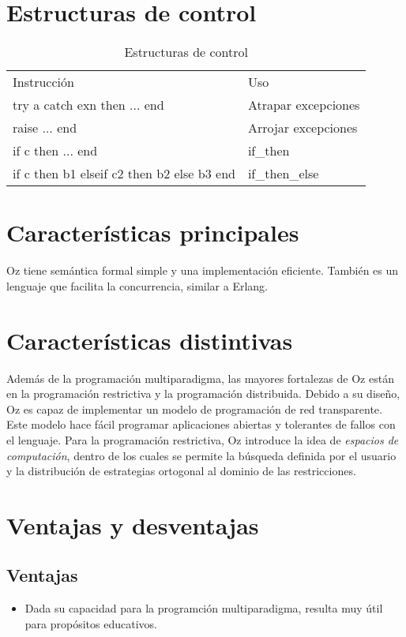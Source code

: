 \documentclass{IEEEtran}
\begin{document}
\section{Estructuras de control}
\begin{table}[H]
\centering
\caption{Estructuras de control}
\label{my-label}
\begin{tabular}{ll}
Instrucci\'on                              & Uso                 \\
try a catch exn then ... end               & Atrapar excepciones \\
raise ... end                              & Arrojar excepciones \\
if c then ... end                          & if\_then            \\
if c then b1 elseif c2 then b2 else b3 end & if\_then\_else     
\end{tabular}
\end{table}
\section{Caracter\'isticas principales}
Oz tiene sem\'antica formal simple y una implementaci\'on eficiente. Tambi\'en es un lenguaje que facilita la concurrencia, similar a Erlang.

\section{Caracter\'isticas distintivas}
Adem\'as de la programaci\'on multiparadigma, las mayores fortalezas de Oz est\'an en la programaci\'on restrictiva y la programaci\'on distribuida. Debido a su dise\~no, Oz es capaz de implementar un modelo de programaci\'on de red transparente. Este modelo hace f\'acil programar aplicaciones abiertas y tolerantes de fallos con el lenguaje. Para la programaci\'on restrictiva, Oz introduce la idea de \emph{espacios de computaci\'on}, dentro de los cuales se permite la b\'usqueda definida por el usuario y la distribuci\'on de estrategias ortogonal al dominio de las restricciones.
\section{Ventajas y desventajas}
\subsection{Ventajas}
\begin{itemize}
\item Dada su capacidad para la programci\'on multiparadigma, resulta muy \'util para prop\'ositos educativos.
\end{itemize}
\end{document}
